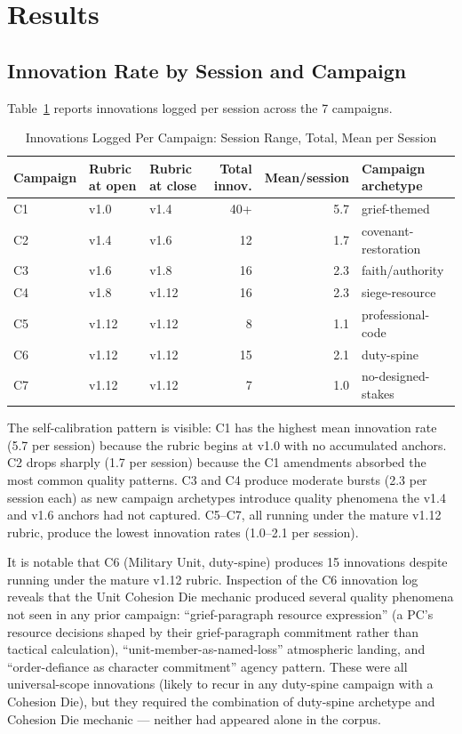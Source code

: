 
\section{Results}
\label{sec:results}

\subsection{Innovation Rate by Session and Campaign}

Table~\ref{tab:innovations} reports innovations logged per session across the 7 campaigns.

\begin{table}[t]
\caption{Innovations Logged Per Campaign: Session Range, Total, Mean per Session}
\label{tab:innovations}
\begin{tabular}{@{}lllrrl@{}}
\toprule
Campaign & Rubric at open & Rubric at close & Total innov. & Mean/session & Campaign archetype \\
\midrule
C1 & v1.0 & v1.4 & 40+ & 5.7 & grief-themed \\
C2 & v1.4 & v1.6 & 12 & 1.7 & covenant-restoration \\
C3 & v1.6 & v1.8 & 16 & 2.3 & faith/authority \\
C4 & v1.8 & v1.12 & 16 & 2.3 & siege-resource \\
C5 & v1.12 & v1.12 & 8 & 1.1 & professional-code \\
C6 & v1.12 & v1.12 & 15 & 2.1 & duty-spine \\
C7 & v1.12 & v1.12 & 7 & 1.0 & no-designed-stakes \\
\bottomrule
\end{tabular}
\end{table}

The self-calibration pattern is visible: C1 has the highest mean innovation rate (5.7
per session) because the rubric begins at v1.0 with no accumulated anchors. C2 drops
sharply (1.7 per session) because the C1 amendments absorbed the most common quality
patterns. C3 and C4 produce moderate bursts (2.3 per session each) as new campaign
archetypes introduce quality phenomena the v1.4 and v1.6 anchors had not captured.
C5--C7, all running under the mature v1.12 rubric, produce the lowest innovation rates
(1.0--2.1 per session).

It is notable that C6 (Military Unit, duty-spine) produces 15 innovations despite
running under the mature v1.12 rubric. Inspection of the C6 innovation log reveals
that the Unit Cohesion Die mechanic produced several quality phenomena not seen in
any prior campaign: ``grief-paragraph resource expression'' (a PC's resource decisions
shaped by their grief-paragraph commitment rather than tactical calculation),
``unit-member-as-named-loss'' atmospheric landing, and ``order-defiance as character
commitment'' agency pattern. These were all universal-scope innovations (likely to
recur in any duty-spine campaign with a Cohesion Die), but they required the
combination of duty-spine archetype and Cohesion Die mechanic --- neither had appeared
alone in the corpus.

